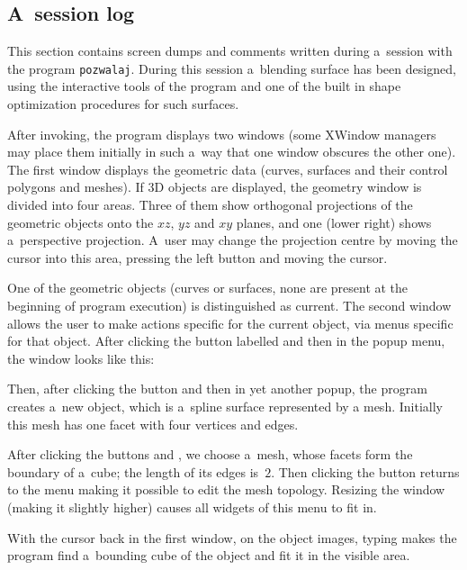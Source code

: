 \subsection{A~session log}

This section contains screen dumps and comments written during a~session with
the program \texttt{pozwalaj}. During this session a~blending surface has
been designed, using the interactive tools of the program and one of the
built in shape optimization procedures for such surfaces.

After invoking, the program displays two windows (some XWindow managers may
place them initially in such a~way that one window obscures the other one). The first
window displays the geometric data (curves, surfaces and their control
polygons and meshes). If 3D objects are displayed, the geometry
window is divided into four areas. Three of them show orthogonal projections
of the geometric objects onto the $xz$, $yz$ and $xy$ planes, and one (lower
right) shows a~perspective projection. A~user may change the projection
centre by moving the cursor into this area, pressing the left button and
moving the cursor.


\newpage
One of the geometric objects (curves or surfaces, none are present at the
beginning of program execution) is distinguished as current. 
The second window allows the user to make actions specific for the current
object, via menus specific for that object. After clicking the
button labelled  and then  in the popup menu,
the window looks like this:


Then, after clicking the button  and then 
in yet another popup, the program creates a~new object, which is a~spline surface
represented by a mesh. Initially this mesh has one facet with four vertices
and edges.

After clicking the buttons  and , we choose
a~mesh, whose facets form the boundary of a~cube; the length of its edges
is~$2$. Then clicking the  button returns to the menu making it
possible to edit the mesh topology. Resizing the window (making it slightly
higher) causes all widgets of this menu to fit in.

\newpage
With the cursor back in the first window, on the object images,
typing  makes the program find a~bounding cube of the object and fit
it in the visible area.

